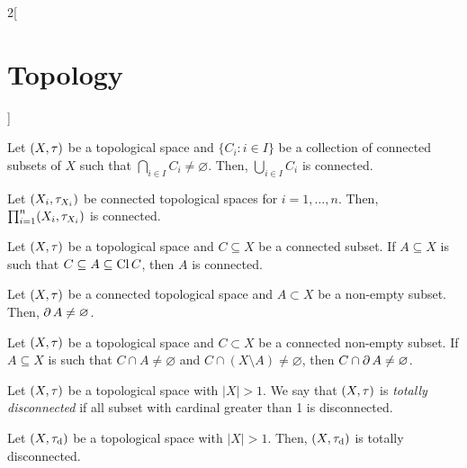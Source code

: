 \documentclass[../../../main.tex]{subfiles}
\begin{document}
\begin{multicols}{2}[\section{Topology}]
\begin{lemma}
    \end{lemma}
    \begin{prop}
        Let $(X,\tau)$ be a topological space and $\{C_i:i\in I\}$ be a collection of connected subsets of $X$ such that $\bigcap_{i\in I} C_i\ne\varnothing$. Then, $\bigcup_{i\in I} C_i$ is connected.
    \end{prop}
    \begin{theorem}
        Let $(X_i,\tau_{X_i})$ be connected topological spaces for $i=1,\ldots,n$. Then, $\prod_{i=1}^n(X_i,\tau_{X_i})$ is connected.
    \end{theorem}
    \begin{theorem}
        Let $(X,\tau)$ be a topological space and $C\subseteq X$ be a connected subset. If $A\subseteq X$ is such that $C\subseteq A\subseteq \operatorname{Cl} C$, then $A$ is connected.
    \end{theorem}
    \begin{prop}
        Let $(X,\tau)$ be a connected topological space and $A\subset X$ be a non-empty subset. Then, $\operatorname{\partial} A\ne\varnothing$.
    \end{prop}
    \begin{prop}
        Let $(X,\tau)$ be a topological space and $C\subset X$ be a connected non-empty subset. If $A\subseteq X$ is such that $C\cap A\ne\varnothing$ and $C\cap(X\setminus A)\ne\varnothing$, then $C\cap\operatorname{\partial} A\ne\varnothing$.
    \end{prop}
    \begin{definition}
        Let $(X,\tau)$ be a topological space with $|X|>1$. We say that $(X,\tau)$ is \emph{totally disconnected} if all subset with cardinal greater than 1 is disconnected.
    \end{definition}
    \begin{prop}
        Let $(X,\tau_\text{d})$ be a topological space with $|X|>1$. Then, $(X,\tau_\text{d})$ is totally disconnected.
    \end{prop}

\end{multicols}
\end{document}
